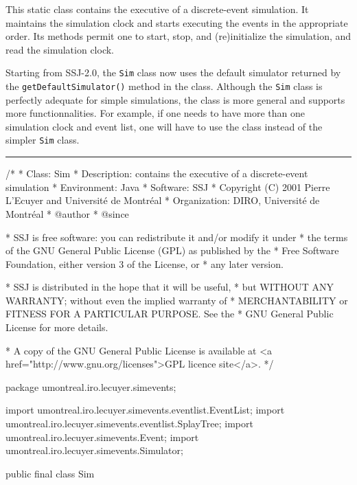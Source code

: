 
This static class contains the executive of a discrete-event simulation.
It maintains the simulation clock and starts executing the events 
in the appropriate order.
Its methods permit one to start, stop, and (re)initialize the simulation,
and read the simulation clock.

Starting from SSJ-2.0, the \texttt{Sim} class now uses
the default simulator returned by the \texttt{getDefaultSimulator()}
method in the  class. Although the \texttt{Sim} class is 
perfectly adequate for simple simulations, the  class
is more general and supports more functionnalities.
For example, if one needs to have more than one simulation clock and event list,
one will have to use the  class instead of the simpler
\texttt{Sim} class.

\bigskip\hrule

\begin{code}
\begin{hide}
/*
 * Class:        Sim
 * Description:  contains the executive of a discrete-event simulation
 * Environment:  Java
 * Software:     SSJ 
 * Copyright (C) 2001  Pierre L'Ecuyer and Université de Montréal
 * Organization: DIRO, Université de Montréal
 * @author       
 * @since

 * SSJ is free software: you can redistribute it and/or modify it under
 * the terms of the GNU General Public License (GPL) as published by the
 * Free Software Foundation, either version 3 of the License, or
 * any later version.

 * SSJ is distributed in the hope that it will be useful,
 * but WITHOUT ANY WARRANTY; without even the implied warranty of
 * MERCHANTABILITY or FITNESS FOR A PARTICULAR PURPOSE.  See the
 * GNU General Public License for more details.

 * A copy of the GNU General Public License is available at
   <a href="http://www.gnu.org/licenses">GPL licence site</a>.
 */
\end{hide}
package umontreal.iro.lecuyer.simevents;\begin{hide}
import umontreal.iro.lecuyer.simevents.eventlist.EventList;
import umontreal.iro.lecuyer.simevents.eventlist.SplayTree;
import umontreal.iro.lecuyer.simevents.Event;
import umontreal.iro.lecuyer.simevents.Simulator;\end{hide}

public final class Sim \begin{hide} {

   // Prevents construction of this object
   private Sim() {}   
\end{hide}
\end{code}
